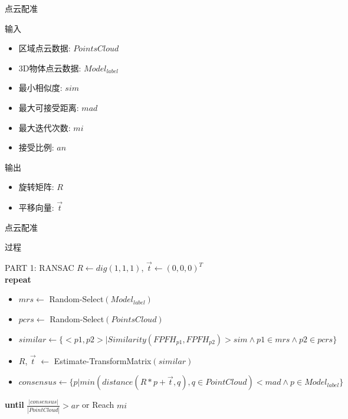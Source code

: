 \documentclass[xcolor=table,compress,blue]{beamer}
\begin{document}
	\begin{frame}{点云配准}
		\begin{exampleblock}{输入}
			\begin{itemize}		
				\item  区域点云数据: $Points Cloud$
				\item  3D物体点云数据: $Model_{label}$
				\item  最小相似度: $sim$
				\item  最大可接受距离: $mad$
				\item  最大迭代次数: $mi$ 
				\item  接受比例: $an$
			\end{itemize}
		\end{exampleblock}
		\begin{exampleblock}{输出}
			\begin{itemize}
				\item 旋转矩阵: $R$
				\item 平移向量: $\vec t$ 
			\end{itemize}
		\end{exampleblock}
	\end{frame}
	
	\begin{frame}{点云配准}
		\vspace{-9pt}
		\begin{exampleblock}{过程}
		\end{exampleblock}
		\vspace{-20pt}
		\begin{exampleblock}{\small{PART 1: RANSAC}}
			$R\leftarrow dig(1,1,1)$, $\vec t\leftarrow (0,0,0)^T$ 
			\\ \textbf{repeat} 
			\begin{itemize}
				\item $mrs \leftarrow $ Random-Select$(Model_{label})$
				\item $pcrs \leftarrow$ Random-Select$(Points Cloud)$
				\item $similar \leftarrow \{<p1,p2>|Similarity(FPFH_{p1},FPFH_{p2})>sim  \wedge p1 \in mrs \wedge p2 \in pcrs\}$
				\item $R$, $\vec t$ $\leftarrow$ Estimate-TransformMatrix$(similar)$
				\item $consensus \leftarrow \{p| min (distance(R*p+\vec t,q), q\in Point Cloud) < mad \wedge p \in Model_{label} \}$
			\end{itemize}
			\textbf{until} \quad $\frac{|consensus|}{|Point Cloud|} > ar$ or Reach $mi$
		\end{exampleblock}
	\end{frame}
	
\end{document}
